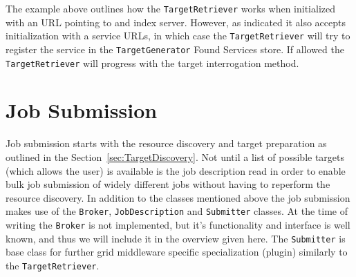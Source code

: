 \documentclass{book}
\newcommand{\TargetGenerator}{\texttt{TargetGenerator}}
\newcommand{\TargetRetriever}{\texttt{TargetRetriever}}
\newcommand{\Broker}{\texttt{Broker}}
\newcommand{\Submitter}{\texttt{Submitter}}
\newcommand{\JobDescription}{\texttt{JobDescription}}
\begin{document}
The example above outlines how the {\TargetRetriever} works when initialized with an URL pointing to and index server. However, 
as indicated it also accepts initialization with a service URLs, in which case the {\TargetRetriever} will try to register the 
service in the {\TargetGenerator} Found Services store. If allowed the {\TargetRetriever} will progress with the target interrogation 
method.

\section{Job Submission}
\label{sec:JobSubmission}
Job submission starts with the resource discovery and target preparation as outlined in the Section~\ref{sec:TargetDiscovery}. 
Not until a list of possible targets (which allows the user) is available is the job description read in order to enable bulk 
job submission of widely different jobs without having to reperform the resource discovery. In addition to the classes mentioned 
above the job submission makes use of the {\Broker}, {\JobDescription} and {\Submitter} classes. At the time of writing the {\Broker} is 
not implemented, but it's functionality and interface is well known, and thus we will include it in the overview given here.
The {\Submitter} is base class for further grid middleware specific specialization (plugin) similarly to the {\TargetRetriever}.

\begin{figure}[ht]
\end{figure}
\end{document}
